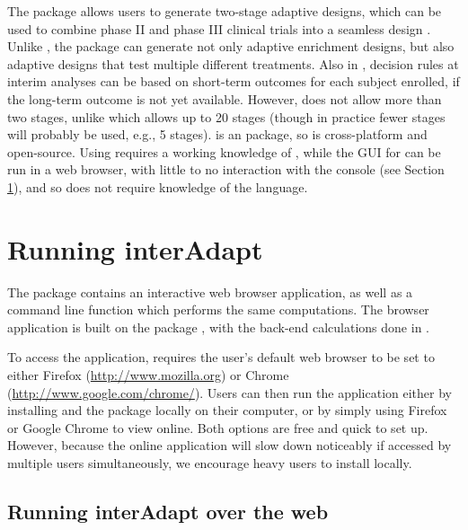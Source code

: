 \documentclass[article]{jss}
\begin{document}
The  package allows  users to generate  two-stage adaptive designs, which can be used to combine phase II and phase III clinical trials into a seamless design \citep{parsons2012r}. Unlike , the  package can generate  not only adaptive enrichment designs, but also adaptive designs that test multiple different treatments. Also in , decision rules at interim analyses can be based on short-term outcomes for each subject enrolled, if the long-term outcome is not yet available. However,  does not allow more than two stages, unlike   which allows up to 20 stages (though in practice fewer stages will probably be used, e.g., 5 stages).  is an   package, so is cross-platform and open-source. Using 
 requires a working knowledge of , while the GUI for  can be run in a web browser, with little to no interaction with the  console (see Section \ref{sec:running-interAdapt}), and so does not require knowledge of the  language.

\section{Running interAdapt }
\label{sec:running-interAdapt}


The   package contains an interactive web browser application, as well as a command line function which performs the same computations. The browser application is built on the  package \citep{shiny2013manual}, with the back-end calculations done in .

To access the  application,  requires the user's default web browser to be set to either Firefox (\url{http://www.mozilla.org}) or Chrome (\url{http://www.google.com/chrome/}). Users can then run the application either by installing  and the  package locally on their computer, or by simply using Firefox or Google Chrome to view  online. Both options are free and quick to set up. However, because the online application will slow down noticeably if accessed by multiple users simultaneously, we encourage heavy users to install  locally.


\subsection{Running interAdapt over the web}
\label{sub:running-online}
\end{document}

